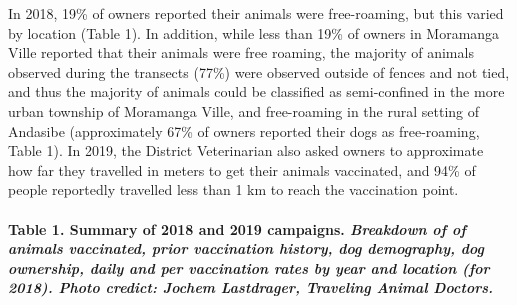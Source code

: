 \documentclass[tropicalmed,article,submit,moreauthors,pdftex]{mdpi}
\begin{document}
In 2018, 19\% of owners reported their animals were free-roaming, but
this varied by location (Table 1). In addition, while less than 19\% of
owners in Moramanga Ville reported that their animals were free roaming,
the majority of animals observed during the transects (77\%) were
observed outside of fences and not tied, and thus the majority of
animals could be classified as semi-confined in the more urban township
of Moramanga Ville, and free-roaming in the rural setting of Andasibe
(approximately 67\% of owners reported their dogs as free-roaming, Table
1). In 2019, the District Veterinarian also asked owners to approximate
how far they travelled in meters to get their animals vaccinated, and
94\% of people reportedly travelled less than 1 km to reach the
vaccination point.

\hypertarget{table-1.-summary-of-2018-and-2019-campaigns.-breakdown-of-of-animals-vaccinated-prior-vaccination-history-dog-demography-dog-ownership-daily-and-per-vaccination-rates-by-year-and-location-for-2018.-photo-credict-jochem-lastdrager-traveling-animal-doctors.}{%
\paragraph{\texorpdfstring{\textbf{Table 1. Summary of 2018 and 2019
campaigns}. \emph{Breakdown of of animals vaccinated, prior vaccination
history, dog demography, dog ownership, daily and per vaccination rates
by year and location (for 2018). Photo credict: Jochem Lastdrager,
Traveling Animal
Doctors.}}{Table 1. Summary of 2018 and 2019 campaigns. Breakdown of of animals vaccinated, prior vaccination history, dog demography, dog ownership, daily and per vaccination rates by year and location (for 2018). Photo credict: Jochem Lastdrager, Traveling Animal Doctors.}}\label{table-1.-summary-of-2018-and-2019-campaigns.-breakdown-of-of-animals-vaccinated-prior-vaccination-history-dog-demography-dog-ownership-daily-and-per-vaccination-rates-by-year-and-location-for-2018.-photo-credict-jochem-lastdrager-traveling-animal-doctors.}}
\end{document}
